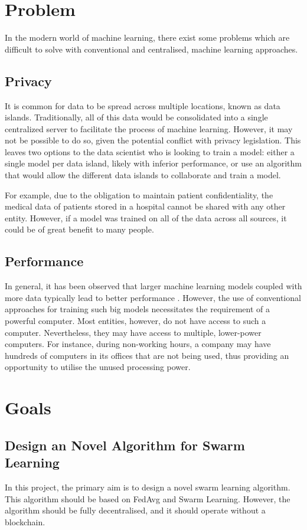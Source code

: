 \section{Problem}
In the modern world of machine learning, there exist some problems which are difficult to solve with conventional and centralised, machine learning approaches.

\subsection{Privacy}
It is common for data to be spread across multiple locations, known as data islands. Traditionally, all of this data would be consolidated into a single centralized server to facilitate the process of machine learning. However, it may not be possible to do so, given the potential conflict with privacy legislation. This leaves two options to the data scientist who is looking to train a model: either a single model per data island, likely with inferior performance, or use an algorithm that would allow the different data islands to collaborate and train a model.

For example, due to the obligation to maintain patient confidentiality, the medical data of patients stored in a hospital cannot be shared with any other entity. However, if a model was trained on all of the data across all sources, it could be of great benefit to many people.

\subsection{Performance}
In general, it has been observed that larger machine learning models coupled with more data typically lead to better performance \citeme. However, the use of conventional approaches for training such big models necessitates the requirement of a powerful computer. Most entities, however, do not have access to such a computer. Nevertheless, they may have access to multiple, lower-power computers. For instance, during non-working hours, a company may have hundreds of computers in its offices that are not being used, thus providing an opportunity to utilise the unused processing power.

\section{Goals}

\subsection{Design an Novel Algorithm for Swarm Learning}
In this project, the primary aim is to design a novel swarm learning algorithm. This algorithm should be based on FedAvg and Swarm Learning. However, the algorithm should be fully decentralised, and it should operate without a blockchain.

